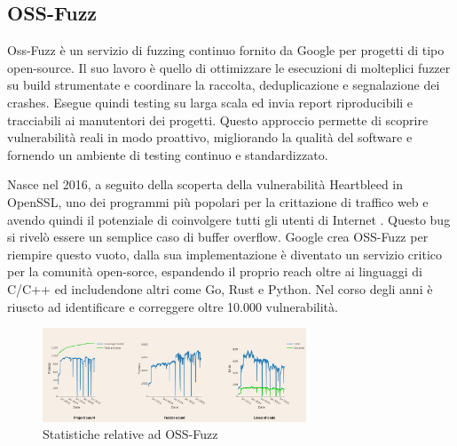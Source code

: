\subsection{OSS-Fuzz}

Oss-Fuzz è un servizio di fuzzing continuo fornito da Google per progetti di tipo open-source. Il suo lavoro è quello di ottimizzare le esecuzioni di molteplici fuzzer su build strumentate e coordinare la raccolta, deduplicazione e segnalazione dei crashes. Esegue quindi testing su larga scala ed invia report riproducibili e tracciabili ai manutentori dei progetti. Questo approccio permette di scoprire vulnerabilità reali in modo proattivo, migliorando la qualità del software e fornendo un ambiente di testing continuo e standardizzato. 

Nasce nel 2016, a seguito della scoperta della vulnerabilità Heartbleed in OpenSSL, uno dei programmi più popolari per la crittazione di traffico web e avendo quindi il potenziale di coinvolgere tutti gli utenti di Internet \cite{ref30}. Questo bug si rivelò essere un semplice caso di buffer overflow. Google crea OSS-Fuzz per riempire questo vuoto, dalla sua implementazione è diventato un servizio critico per la comunità open-sorce, espandendo il proprio reach oltre ai linguaggi di C/C++ ed includendone altri come Go, Rust e Python. Nel corso degli anni è riuscto ad identificare e correggere oltre 10.000 vulnerabilità.

\begin{figure}[htbp]        
  \centering               
  \includegraphics[width=0.7\textwidth]{immagini/oss-fuzz_stats.jpg}  
  \caption{Statistiche relative ad OSS-Fuzz \cite{ref31}}  
  \label{fig:oss-fuzz_stats}      
\end{figure}

